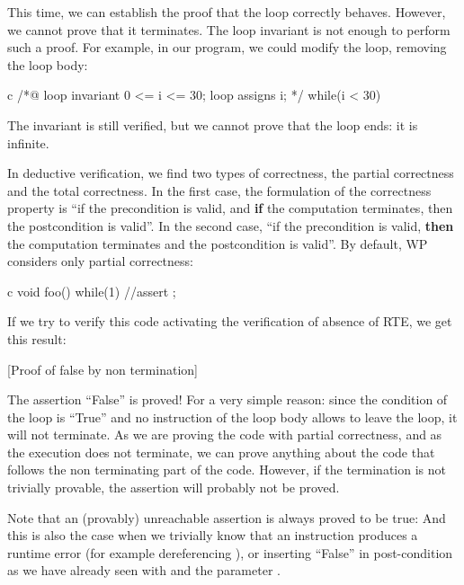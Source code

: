 This time, we can establish the proof that the loop correctly behaves.
However, we cannot prove that it terminates. The loop invariant is not
enough to perform such a proof. For example, in our program, we could
modify the loop, removing the loop body:



\begin{CodeBlock}{c}
/*@
  loop invariant 0 <= i <= 30;
  loop assigns i;
*/
while(i < 30){
   
}
\end{CodeBlock}



The invariant is still verified, but we cannot prove that the loop ends:
it is infinite.





In deductive verification, we find two types of correctness, the partial
correctness and the total correctness. In the first case, the
formulation of the correctness property is ``if the precondition is
valid, and \textbf{if} the computation terminates, then the
postcondition is valid''. In the second case, ``if the precondition is
valid, \textbf{then} the computation terminates and the postcondition is
valid''. By default, WP considers only partial correctness:



\begin{CodeBlock}{c}
void foo(){
  while(1){}
  //assert \false;
}
\end{CodeBlock}



If we try to verify this code activating the verification of absence of
RTE, we get this result:



[Proof of false by non termination]


The assertion ``False'' is proved! For a very simple reason: since the
condition of the loop is ``True'' and no instruction of the loop body
allows to leave the loop, it will not terminate. As we are proving the
code with partial correctness, and as the execution does not terminate,
we can prove anything about the code that follows the non terminating
part of the code. However, if the termination is not trivially provable,
the assertion will probably not be proved.



\begin{Information}
  Note that an (provably) unreachable assertion is always proved to be true:
  And this is also the case when we trivially know that an instruction
  produces a runtime error (for example dereferencing ), or
  inserting ``False'' in post-condition as we have already seen with
   and the parameter .
\end{Information}



